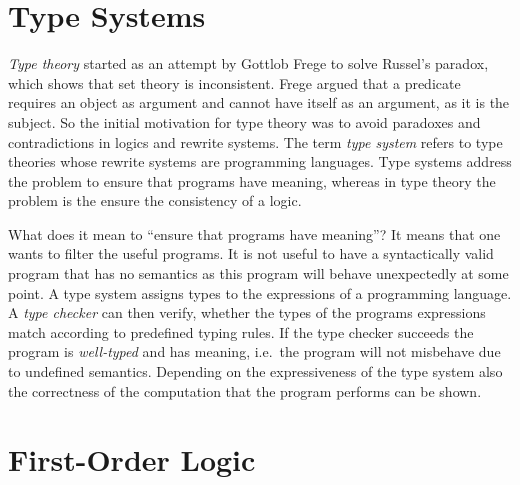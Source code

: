 \section{Type Systems}
\textit{Type theory} started as an attempt by Gottlob Frege to solve
Russel's paradox, which shows that \naive{} set theory is
inconsistent. Frege argued that a predicate requires an object as
argument and cannot have itself as an argument, as it is the
subject. So the initial motivation for type theory was to avoid
paradoxes and contradictions in logics and rewrite systems. The term
\textit{type system} refers to type theories whose rewrite systems are
programming languages. Type systems address the problem to ensure that
programs have meaning, whereas in type theory the problem is the
ensure the consistency of a logic.

What does it mean to ``ensure that programs have meaning''? It means
that one wants to filter the useful programs. It is not useful to have
a syntactically valid program that has no semantics as this program
will behave unexpectedly at some point. A type system assigns types to
the expressions of a programming language. A \textit{type checker} can
then verify, whether the types of the programs expressions match
according to predefined typing rules. If the type checker succeeds the
program is \textit{well-typed} and has meaning, i.e.\ the program will
not misbehave due to undefined semantics. Depending on the
expressiveness of the type system also the correctness of the
computation that the program performs can be shown.

\section{First-Order Logic}

